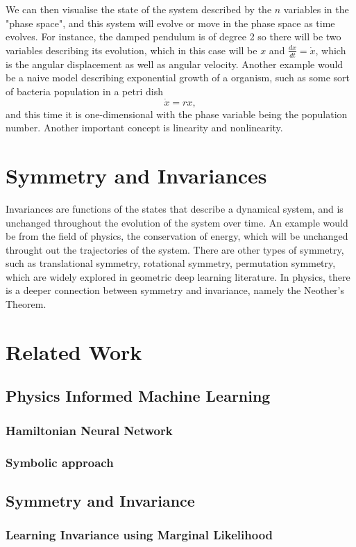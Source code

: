 \documentclass{statsmsc}
\begin{document}
We can then visualise the state of the system described by the $n$ variables in the "phase space", and this system will evolve or move in the phase space as time evolves. 
For instance, the damped pendulum is of degree 2 so there will be two variables describing its evolution, which in this case will be $x$ and $\frac{dx}{dt}=\dot{x}$, which is the angular displacement as well as angular velocity.
Another example would be a naive model describing exponential growth of a organism, such as some sort of bacteria population in a petri dish
$$
\dot{x}=rx,
$$
and this time it is one-dimensional with the phase variable being the population number.
Another important concept is linearity and nonlinearity. 


\section{Symmetry and Invariances}
Invariances are functions of the states that describe a dynamical system, and is unchanged throughout the evolution of the system over time. 
An example would be from the field of physics, the conservation of energy, which will be unchanged throught out the trajectories of the system.
There are other types of symmetry, such as translational symmetry, rotational symmetry, permutation symmetry, which are widely explored in geometric deep learning literature. 
In physics, there is a deeper connection between symmetry and invariance, namely the Neother's Theorem.


\section{Related Work}
\subsection{Physics Informed Machine Learning}
\subsubsection{Hamiltonian Neural Network}
\subsubsection{Symbolic approach}
\subsection{Symmetry and Invariance}
\subsubsection{Learning Invariance using Marginal Likelihood}
\end{document}

